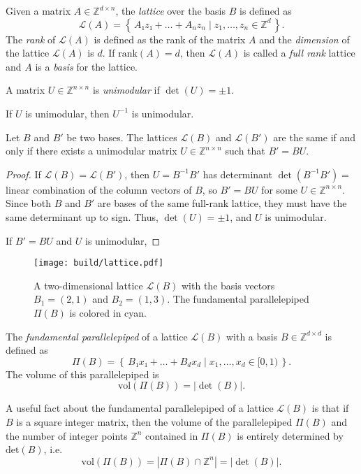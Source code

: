 \begin{definition}
  Given a matrix $A ∈ ℤ^{d × n}$, the \emph{lattice} over the basis $B$ is defined as
  \[
    \mathcal{L}(A) = \left\{\, A₁z₁ + \dots + A_n z_n \mid z_1, \dots, z_n ∈ ℤ^d \,\right\}.
  \]
  The \emph{rank} of $\mathcal{L}(A)$ is defined as the rank of the matrix $A$
  and the \emph{dimension} of the lattice $\mathcal{L}(A)$ is $d$.
  If $\mathrm{rank}(A) = d$, then $\mathcal{L}(A)$ is called a \emph{full rank}
  lattice and $A$ is a \emph{basis} for the lattice.
\end{definition}

\begin{definition}
  A matrix $U ∈ ℤ^{n×n}$ is \emph{unimodular} if $\det(U) = ±1$.
\end{definition}

\begin{lemma}
  If $U$ is unimodular, then $U^{-1}$ is unimodular.
\end{lemma}

\begin{lemma}
  Let $B$ and $B'$ be two bases.
  The lattices $\mathcal L(B)$ and $\mathcal L(B')$ are the same if and only if
  there exists a unimodular matrix $U ∈ ℤ^{n×n}$ such that $B' = BU$.
\end{lemma}

\begin{proof}
  If $\mathcal{L}(B) = \mathcal{L}(B')$, then $U = B^{-1} B'$ has determinant $\det(B^{-1} B') = $
  linear combination of the column vectors of $B$, so $B' = BU$ for some $U ∈ ℤ^{n×n}$.
  Since both $B$ and $B'$ are bases of the same full-rank lattice, they must have
  the same determinant up to sign.
  Thus, $\det(U) = ±1$, and $U$ is unimodular.

  If $B' = BU$ and $U$ is unimodular,
\end{proof}

\begin{figure}[tbp]
  \centering
  \texttt{[image: build/lattice.pdf]}
  \caption{
    A two-dimensional lattice $\mathcal L(B)$ with the basis vectors $B_1 = (2,
    1)$ and $B_2 = (1, 3)$. The fundamental parallelepiped $Π(B)$ is colored in
    {\color{cyan}cyan}.
  }
\end{figure}

\begin{definition}
  The \emph{fundamental parallelepiped} of a lattice $\mathcal{L}(B)$ with a basis $B ∈ ℤ^{d×d}$ is defined as
  \[
    Π(B) = \left\{\, B₁ x₁ + \dots + B_d x_d \mid x_1, \dots, x_d ∈ [0, 1) \,\right\}.
  \]
  The volume of this parallelepiped is
  \[
    \mathrm{vol}(Π(B)) = |\det(B)|.
  \]
\end{definition}

A useful fact about the fundamental parallelepiped of a lattice $\mathcal L(B)$
is that if $B$ is a square integer matrix, then the volume of the
parallelepiped $Π(B)$ and the number of integer points $ℤ^n$ contained in
$Π(B)$ is entirely determined by $\mathrm{det}(B)$, i.e.
\[
  \mathrm{vol}(Π(B)) = |Π(B) ∩ ℤ^n| = |\det(B)|.
\]

